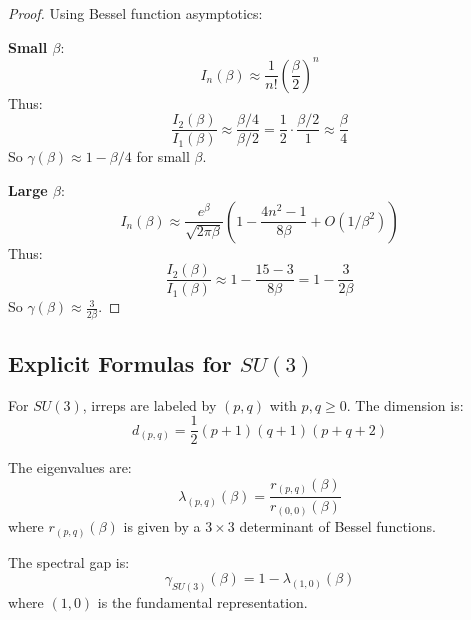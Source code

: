\begin{proof}
Using Bessel function asymptotics:

\textbf{Small $\beta$}:
\begin{equation}
I_n(\beta) \approx \frac{1}{n!}\left(\frac{\beta}{2}\right)^n
\end{equation}
Thus:
\begin{equation}
\frac{I_2(\beta)}{I_1(\beta)} \approx \frac{\beta/4}{\beta/2} = \frac{1}{2} \cdot \frac{\beta/2}{1} \approx \frac{\beta}{4}
\end{equation}
So $\gamma(\beta) \approx 1 - \beta/4$ for small $\beta$.

\textbf{Large $\beta$}:
\begin{equation}
I_n(\beta) \approx \frac{e^\beta}{\sqrt{2\pi\beta}} \left(1 - \frac{4n^2-1}{8\beta} + O(1/\beta^2)\right)
\end{equation}
Thus:
\begin{equation}
\frac{I_2(\beta)}{I_1(\beta)} \approx 1 - \frac{15-3}{8\beta} = 1 - \frac{3}{2\beta}
\end{equation}
So $\gamma(\beta) \approx \frac{3}{2\beta}$.
\end{proof}

\subsection{Explicit Formulas for \texorpdfstring{$SU(3)$}{SU(3)}}

\begin{theorem}
\label{thm:su3-spectrum}
For $SU(3)$, irreps are labeled by $(p,q)$ with $p,q \geq 0$. The dimension is:
\begin{equation}
d_{(p,q)} = \frac{1}{2}(p+1)(q+1)(p+q+2)
\end{equation}

The eigenvalues are:
\begin{equation}
\lambda_{(p,q)}(\beta) = \frac{r_{(p,q)}(\beta)}{r_{(0,0)}(\beta)}
\end{equation}
where $r_{(p,q)}(\beta)$ is given by a $3 \times 3$ determinant of Bessel functions.

The spectral gap is:
\begin{equation}
\gamma_{SU(3)}(\beta) = 1 - \lambda_{(1,0)}(\beta)
\end{equation}
where $(1,0)$ is the fundamental representation.
\end{theorem}

